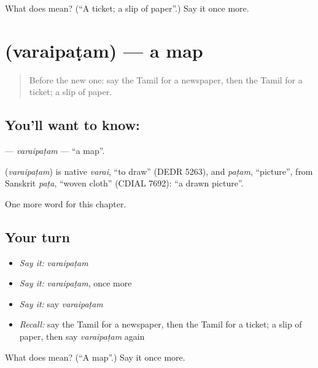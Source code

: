 \begin{tcolorbox}[breakable,colback=teal!4,colframe=teal!35!black,title={Before you move on}]
What does  mean? (\textquotedblleft{}A ticket; a slip of paper\textquotedblright{}.) Say it once more.
\end{tcolorbox}
\section[\texorpdfstring{\ta{வரைபடம்} (varaipaṭam)}{வரைபடம் (varaipaṭam)}]{ (varaipaṭam) — a map}

\label{lesson:TA-C216-varaipatam}



\begin{quote}
Before the new one: say the Tamil for a newspaper, then the Tamil for a ticket; a slip of paper.
\end{quote}

\subsection*{You'll want to know: }
\textbf{} — \emph{varaipaṭam} — \textquotedblleft{}a map\textquotedblright{}.

\begin{cousinweb}
\textbf{} (\emph{varaipaṭam}) is native \emph{varai}, \textquotedblleft{}to draw\textquotedblright{} (DEDR 5263), and \emph{paṭam}, \textquotedblleft{}picture\textquotedblright{}, from Sanskrit \emph{paṭa}, \textquotedblleft{}woven cloth\textquotedblright{} (CDIAL 7692): \textquotedblleft{}a drawn picture\textquotedblright{}.
\end{cousinweb}

\begin{grammarlens}[title={What you've built}]
One more word for this chapter.
\end{grammarlens}

\subsection*{Your turn}
\begin{itemize}
\raggedright
  \item \emph{Say it:} \emph{varaipaṭam}
  \item \emph{Say it:} \emph{varaipaṭam}, once more
  \item \emph{Say it:} say \emph{varaipaṭam}
  \item \emph{Recall:} say the Tamil for a newspaper, then the Tamil for a ticket; a slip of paper, then say \emph{varaipaṭam} again
\end{itemize}

\begin{tcolorbox}[breakable,colback=teal!4,colframe=teal!35!black,title={Before you move on}]
What does  mean? (\textquotedblleft{}A map\textquotedblright{}.) Say it once more.
\end{tcolorbox}
